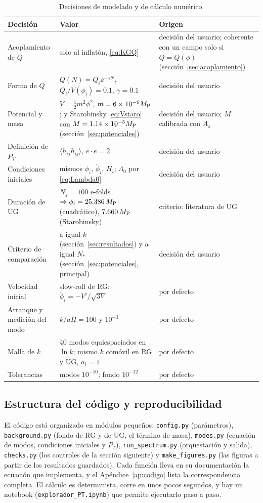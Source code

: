 \begin{table}[t]
\centering\small
\renewcommand{\arraystretch}{1.25}
\begin{tabular}{@{}p{4.0cm}p{5.2cm}p{4.2cm}@{}}
\toprule
\textbf{Decisión} & \textbf{Valor} & \textbf{Origen}\\
\midrule
Acoplamiento de $Q$ & solo al inflatón, \eqref{eq:KGQ} & decisión del usuario; coherente con un campo solo si $Q=Q(\phi)$ (sección~\ref{sec:acoplamiento})\\
Forma de $Q$ & $Q(N)=Q_i\ee^{-\gamma N}$, $Q_i/V(\phi_i)=0.1$, $\gamma=0.1$ & decisión del usuario\\
Potencial y masa & $V=\tfrac12m^2\phi^2$, $m=6\times10^{-6}M_{\rm P}$; y Starobinsky \eqref{eq:Vstaro} con $M=1.14\times10^{-5}M_{\rm P}$ (sección~\ref{sec:potenciales}) & decisión del usuario; $M$ calibrada con $A_s$\\
Definición de $P_T$ & $\langle h_{ij}h_{ij}\rangle$, $e\cdot e=2$ & decisión del usuario\\
Condiciones iniciales & mismos $\phi_i$, $\dot\phi_i$, $H_i$; $\Lambda_0$ por \eqref{eq:Lambda0} & decisión del usuario\\
Duración de UG & $N_f=100$ e-folds $\Rightarrow\phi_i=25.386\,M_{\rm P}$ (cuadrático), $7.660\,M_{\rm P}$ (Starobinsky) & criterio: literatura de UG\\
Criterio de comparación & a igual $k$ (sección~\ref{sec:resultados}) y a igual $N_*$ (sección~\ref{sec:potenciales}, principal) & decisión del usuario\\
Velocidad inicial & slow-roll de RG: $\dot\phi_i=-V'/\sqrt{3V}$ & por defecto\\
Arranque y medición del modo & $k/aH=100$ y $10^{-3}$ & por defecto\\
Malla de $k$ & 40 modos equiespaciados en $\ln k$; mismo $k$ comóvil en RG y UG, $a_i=1$ & por defecto\\
Tolerancias & modos $10^{-10}$; fondo $10^{-12}$ & por defecto\\
\bottomrule
\end{tabular}
\caption{Decisiones de modelado y de cálculo numérico.}
\label{tab:decisiones}
\end{table}

\subsection{Estructura del código y reproducibilidad}

El código está organizado en módulos pequeños: \texttt{config.py} (parámetros), \texttt{background.py} (fondo de RG y de UG, el término de masa), \texttt{modes.py} (ecuación de modos, condiciones iniciales y $P_T$), \texttt{run\_spectrum.py} (orquestación y salida), \texttt{checks.py} (los controles de la sección siguiente) y \texttt{make\_figures.py} (las figuras a partir de los resultados guardados). Cada función lleva en su documentación la ecuación que implementa, y el Apéndice~\ref{ap:codigo} lista la correspondencia completa. El cálculo es determinista, corre en unos pocos segundos, y hay un notebook (\texttt{explorador\_PT.ipynb}) que permite ejecutarlo paso a paso.
